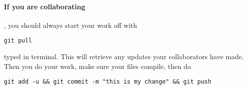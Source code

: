 \documentclass{ximera}
\begin{document}
\paragraph{If you are collaborating}, you should always start your work off with
\begin{verbatim}
git pull
\end{verbatim}
typed in terminal. This will retrieve any updates your collaborators have made. Then you do your work, make sure your files compile, then do 
\begin{verbatim}
git add -u && git commit -m "this is my change" && git push
\end{verbatim}
      



\end{document}
